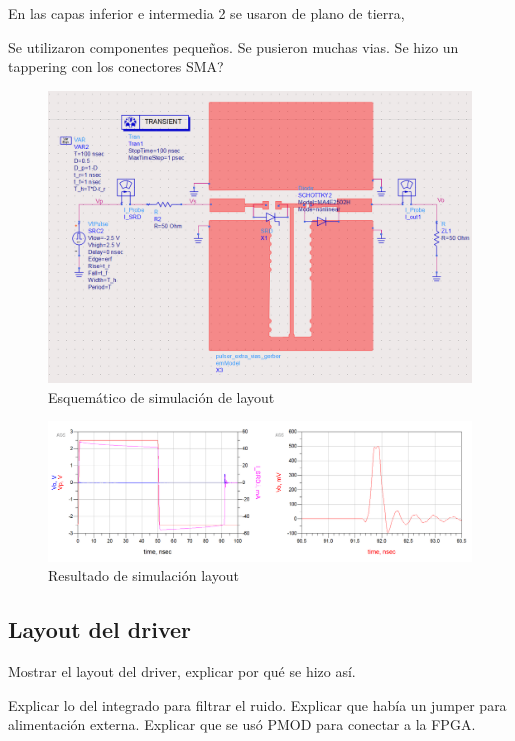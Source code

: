 En las capas inferior e intermedia 2 se usaron de plano de tierra,

Se utilizaron componentes pequeños. Se pusieron muchas vias. Se hizo un
tappering con los conectores SMA?

\begin{figure}[tbp]
    \centering
    \includegraphics[width=\textwidth]{images/layout_simulation_sch.png}
    \caption{Esquemático de simulación de layout}
    \label{fig:layout_simulation_sch}
\end{figure}

\begin{figure}[tbp]
    \centering
    \includegraphics[width=\textwidth]{images/layout_simulation_result.png}
    \caption{Resultado de simulación layout}
    \label{fig:layout_simulation_result}
\end{figure}

\subsection{Layout del driver}

Mostrar el layout del driver, explicar por qué se hizo así.

Explicar lo del integrado para filtrar el ruido. Explicar que había un jumper
para alimentación externa. Explicar que se usó PMOD para conectar a la FPGA.

